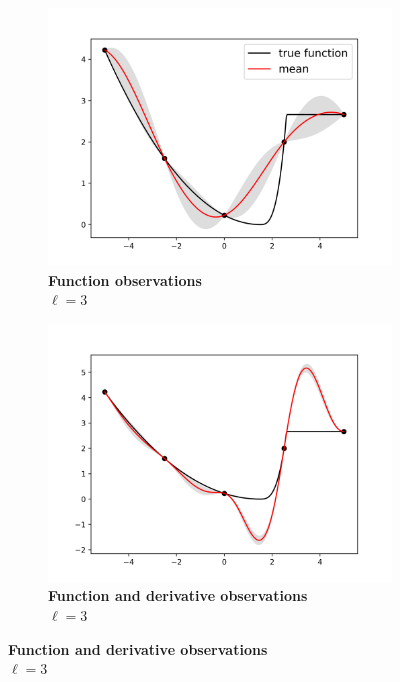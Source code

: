 \documentclass{article}
\numberwithin{equation}{section}
\begin{document}
\begin{figure}[H]
		\centering
		\captionsetup{justification=centering}
    \begin{subfigure}[t]{.33\textwidth}
      \centering
      \includegraphics[scale=0.35]{figures/kink-noder.png}
      \caption{\textbf{Function observations} \\ $\ell = 3$}
    \end{subfigure}%
    \begin{subfigure}[t]{.33\textwidth}
      \centering
      \includegraphics[scale=0.35]{figures/kink-der.png}
      \caption{\textbf{Function and derivative observations} \\ $\ell = 3$}
    \end{subfigure}%

\end{figure}
\end{document}
